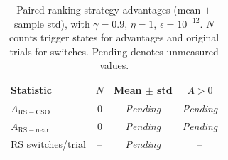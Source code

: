 \begin{table}[t]
\centering
\caption{Paired ranking-strategy advantages (mean $\pm$ sample std),
with $\gamma=0.9$, $\eta=1$,
$\epsilon=10^{-12}$. $N$ counts trigger states for advantages
and original trials for switches. Pending denotes unmeasured values.}
\label{tab:ranking_counterfactual}
\small
\begin{tabular}{lccc}
\toprule
Statistic & $N$ & Mean $\pm$ std & $A>0$ \\
\midrule
$A_{\mathrm{RS}-\mathrm{CSO}}$ & 0 & \textit{Pending} & \textit{Pending} \\
$A_{\mathrm{RS}-\mathrm{near}}$ & 0 & \textit{Pending} & \textit{Pending} \\
\midrule
RS switches/trial & -- & \textit{Pending} & -- \\
\bottomrule
\end{tabular}
\end{table}

